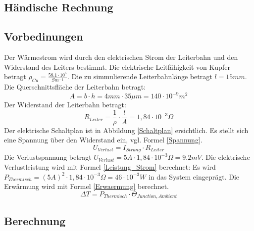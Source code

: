 \documentclass[10pt,a4paper,oneside,abstracton]{scrartcl}
\begin{document}
\begin{multicols}{2}
\section{Händische Rechnung}
\subsection{Vorbedinungen}
Der Wärmestrom wird durch den elektrischen Strom der Leiterbahn und den Widerstand des Leiters bestimmt. 
\newline
Die elektrische Leitfähigkeit von Kupfer betragt 
\newline
$ \rho_{Cu} = \frac{58.1\cdot 10^6}{Sm^{-1}} $.
\newline
Die zu simmulierende Leiterbahnlänge betragt
\newline
 $l = 15 mm$.
\newline
Die Querschnittsfläche der Leiterbahn betragt: 
\begin{equation}
	A = b \cdot h = 4 mm \cdot 35 \mu m = 140 \cdot 10 ^{-9} m^2
\end{equation}
Der Widerstand der Leiterbahn betragt: 
\begin{equation}
	R_{Leiter} = \frac{1}{\rho} \cdot \frac{l}{A} = 1,84 \cdot 10^{-3} \Omega
\end{equation}
\noindent
Der elektrische Schaltplan ist in Abbildung \ref*{Schaltplan} ersichtlich.  \newline
Es stellt sich eine Spannung über den Widerstand ein, vgl. Formel \ref*{Spannung}. 
\begin{equation}
	U_{Verlust} =  I_{Strang} \cdot R_{Leiter}
	\label{Spannung}
\end{equation}
\noindent
Die Verlustspannung betragt $U_{Verlust} = 5A \cdot 1,84 \cdot 10^{-3} \Omega = 9.2 mV$. 
Die elektrische Verlustleistung wird mit Formel \ref*{Leistung_Strom} berechnet: 
Es wird
$ P_{Thermisch} = (5A)^2 \cdot 1,84 \cdot 10^{-3} \Omega = 46 \cdot 10^{-3} W $ 
in das System eingeprägt.
Die Erwärmung wird mit Formel \ref*{Erwaermung} berechnet.
\begin{equation}
	\Delta T = P_{Thermisch} \cdot \Theta_{Junction, Ambient}
	\label{Erwaermung}
\end{equation}

\subsection{Berechnung }


\end{multicols}
\end{document}
